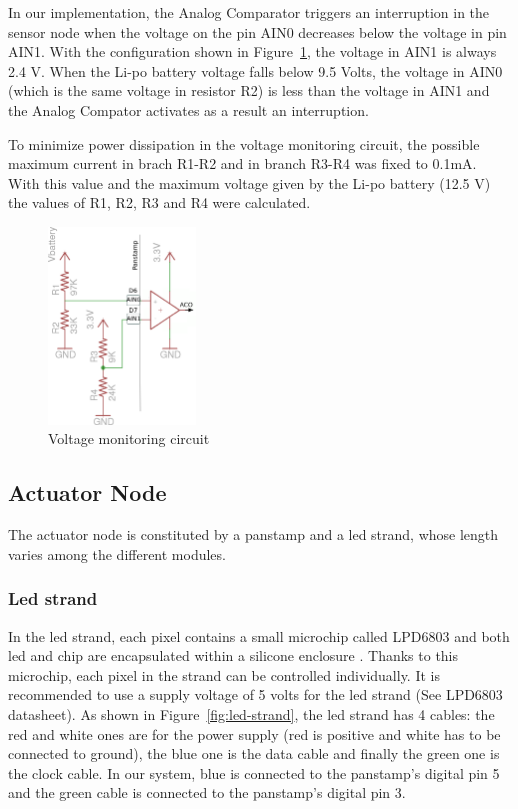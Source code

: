 In our implementation, the Analog Comparator triggers an interruption in the sensor node when the voltage on the pin AIN0 decreases below the voltage in pin AIN1. With the configuration shown in Figure~\ref{fig:voltage-monitor}, the voltage in AIN1 is always 2.4 V. When the Li-po battery voltage falls below 9.5 Volts, the voltage in AIN0 (which is the same voltage in resistor R2) is less than the voltage in AIN1 and the Analog Compator activates as a result an interruption.

To minimize power dissipation in the voltage monitoring circuit, the possible maximum current in brach R1-R2 and in branch R3-R4 was fixed to 0.1mA. With this value and the maximum voltage given by the Li-po battery (12.5 V) the values of R1, R2, R3 and R4 were calculated.  

\begin{figure}[h!] 
 \centering
 \includegraphics[width= 0.35\textwidth, clip=true,keepaspectratio=true]{./graph/voltage_comparator_circuit.png}
 \caption{Voltage monitoring circuit}
 \label{fig:voltage-monitor}
\end{figure}

\subsection{Actuator Node}
The actuator node is constituted by a panstamp and a led strand, whose length varies among the different modules. 
\subsubsection{Led strand}
In the led strand, each pixel contains a small microchip called LPD6803 and both led and chip are encapsulated within a silicone enclosure . Thanks to this microchip, each pixel in the strand can be controlled individually. It is recommended to use a supply voltage of 5 volts for the led strand (See LPD6803 datasheet). As shown in Figure~\ref{fig:led-strand}, the led strand has 4 cables: the red and white ones are for the power supply (red is positive and white has to be connected to ground), the blue one is the data cable and finally the green one is the clock cable. In our system, blue is connected to the panstamp's digital pin 5 and the green cable is connected to the panstamp's digital pin 3. 

